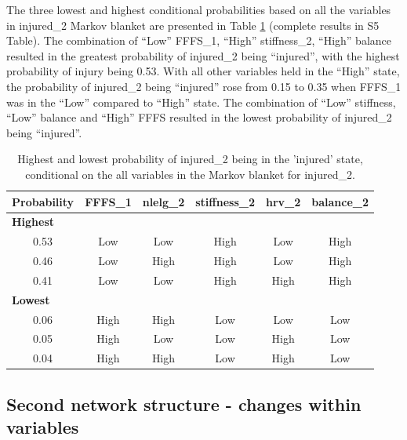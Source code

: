 \documentclass[
  english,
  man,floatsintext]{apa6}
\begin{document}
The three lowest and highest conditional probabilities based on all the variables in injured\_2 Markov blanket are presented in Table \ref{tab:table8} (complete results in S5 Table).
The combination of ``Low'' FFFS\_1, ``High'' stiffness\_2, ``High'' balance resulted in the greatest probability of injured\_2 being ``injured'', with the highest probability of injury being 0.53.
With all other variables held in the ``High'' state, the probability of injured\_2 being ``injured'' rose from 0.15 to 0.35 when FFFS\_1 was in the ``Low'' compared to ``High'' state.
The combination of ``Low'' stiffness, ``Low'' balance and ``High'' FFFS resulted in the lowest probability of injured\_2 being ``injured''.

\begin{table}[H]

\caption{\label{tab:table8}Highest and lowest probability of injured\_2 being in the 'injured' state, conditional on the all variables in the Markov blanket for injured\_2.}
\centering
\begin{tabular}[t]{c|c|c|c|c|c}
\hline
\textbf{Probability} & \textbf{FFFS\_1} & \textbf{nlelg\_2} & \textbf{stiffness\_2} & \textbf{hrv\_2} & \textbf{balance\_2}\\
\hline
\multicolumn{6}{l}{\textbf{Highest}}\\
\hline
\hspace{1em}0.53 & Low & Low & High & Low & High\\
\hline
\hspace{1em}0.46 & Low & High & High & Low & High\\
\hline
\hspace{1em}0.41 & Low & Low & High & High & High\\
\hline
\multicolumn{6}{l}{\textbf{Lowest}}\\
\hline
\hspace{1em}0.06 & High & High & Low & Low & Low\\
\hline
\hspace{1em}0.05 & High & Low & Low & High & Low\\
\hline
\hspace{1em}0.04 & High & High & Low & High & Low\\
\hline
\end{tabular}
\end{table}

\hypertarget{second-network-structure---changes-within-variables}{%
\subsection{Second network structure - changes within variables}\label{second-network-structure---changes-within-variables}}
\end{document}
